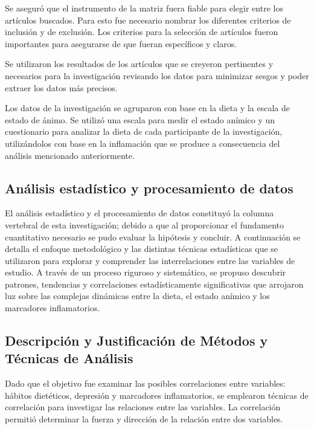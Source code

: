 \documentclass[stu, 12pt]{apa7}
\begin{document}
	Se aseguró que el instrumento de la matriz fuera fiable para elegir entre los artículos buscados. Para esto fue necesario nombrar los diferentes criterios de inclusión y de exclusión. Los criterios para la selección de artículos fueron importantes para asegurarse de que fueran específicos y claros.

	Se utilizaron los resultados de los artículos que se creyeron
	pertinentes y necesarios para la investigación revisando los datos
	para minimizar sesgos y poder extraer los datos más precisos.

	Los datos de la investigación se agruparon con base en la dieta y la
	escala de estado de ánimo. Se utilizó una escala para medir el estado
	anímico y un cuestionario para analizar la dieta de cada participante de
	la investigación, utilizándolos con base en la inflamación que se produce
	a consecuencia del análisis mencionado anteriormente.

	\subsection{Análisis estadístico y procesamiento de datos}

	El análisis estadístico y el procesamiento de datos constituyó la
	columna vertebral de esta investigación; debido a que al proporcionar el
	fundamento cuantitativo necesario se pudo evaluar la hipótesis y
	concluir. A continuación se detalla el enfoque metodológico y las
	distintas técnicas estadísticas que se utilizaron para explorar y comprender
	las interrelaciones entre las variables de estudio. A través de un
	proceso riguroso y sistemático, se propuso descubrir patrones,
	tendencias y correlaciones estadísticamente significativas que arrojaron
	luz sobre las complejas dinámicas entre la dieta, el estado anímico y
	los marcadores inflamatorios.

	\subsection{Descripción y Justificación de Métodos y Técnicas de Análisis}\label{subsec:descripcionYJustificacionDeMetodos}

	Dado que el objetivo fue examinar las posibles correlaciones entre
	variables: hábitos dietéticos, depresión y marcadores
	inflamatorios, se emplearon técnicas de correlación para
	investigar las relaciones entre las variables. La correlación permitió
	determinar la fuerza y dirección de la relación entre dos
	variables.\\
\end{document}
